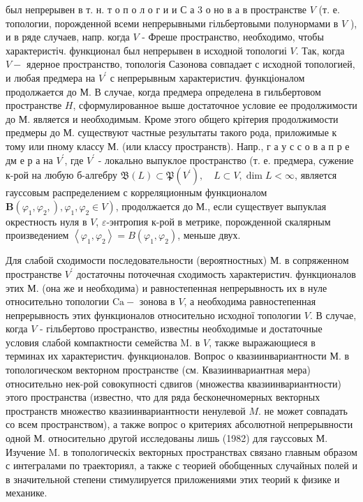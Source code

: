 \documentclass[10pt]{article}
\begin{document}
был непрерывен в т. н. т о п о л о г и и С а 3 о но в а в пространстве $V$ (т. е. топологии, порожденной всеми непрерывными гільбертовыми полунормами в $V$ ), и в ряде случаев, напр. когда $V$ - Фреше пространство, необходимо, чтобы характеристіч. функционал был непрерывен в исходной топологиі $V$. Так, когда $V-$ ядерное пространство, топологія Сазонова совпадает с исходной топологией, и любая предмера на $V^{\prime}$ с непрерывным характеристич. функціоналом продолжается до М. В случае, когда предмера определена в гильбертовом пространстве $H$, сформулированное выше достаточное условие ее продолжимости до М. является и необходимым. Кроме этого общего крітерия продолжимости предмеры до М. существуют частные резулытаты такого рода, приложимые к тому или пному классу М. (или классу пространств). Напр., г а у с с о в а п р е дм е р а на $V^{\prime}$, где $V^{\prime}$ - локально выпуклое пространство (т. е. предмера, сужение к-рой на любую б-алгебру $\mathfrak{B}(L) \subset \mathfrak{P}\left(V^{\prime}\right), \quad L \subset V, \operatorname{dim} L<\infty$, является гауссовым распределением с корреляционным функционалом $\left.\boldsymbol{B}\left(\varphi_{1}, \varphi_{2},\right), \varphi_{1}, \varphi_{2} \in V\right)$, продолжается до М., если существует выпуклая окрестность нуля в $V$, $\varepsilon$-энтропия к-рой в метрике, порожденной скалярным произведением $\left\langle\varphi_{1}, \varphi_{2}\right\rangle=B\left(\varphi_{1}, \varphi_{2}\right)$, меньше двух.



Для слабой сходимости последовательности (вероятностных) М. в сопряженном пространстве $V^{\prime}$ достаточны поточечная сходимость характеристич. функционалов этих М. (она же и необходима) и равностепенная непрерывность их в нуле относительно топологии $\mathrm{Ca}-$ зонова в $V$, а необходима равностепенная непрерывность этих функционалов относительно исходної топологии $V$. В случае, когда $V$ - гільбертово пространство, известны необходимые и достаточные условия слабой компактности семейства M. в $V$, также выражающиеся в терминах их характеристич. функционалов. Вопрос о квазиинвариантности М. в топологическом векторном пространстве (см. Квазиинвариантная мера) относительно нек-рой совокупності сдвигов (множества квазиинвариантности) этого пространства (известно, что для ряда бесконечномерных векторных пространств множество квазиинвариантности ненулевой $M$. не может совпадать со всем пространством), а также вопрос о критериях абсолютной непрерывности одной М. относительно другой исследованы лишь (1982) для гауссовых М. Изучение M. в топологическіх векторных пространствах связано главным образом с интегралами по траекториял, а также с теорией обобщенных случайных полей и в значительной степени стимулируется приложениями этих теорий к физике и механике.
\end{document}
